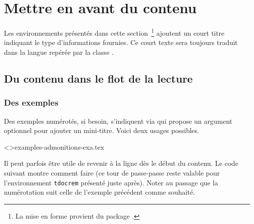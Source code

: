 
\section{Mettre en avant du contenu}

\begin{tdocnote}
    Les environnements présentés dans cette section\,%
    \footnote{
        La mise en forme provient du package .
    }
    ajoutent un court titre indiquant le type d'informations fournies.
    Ce court texte sera toujours traduit dans la langue repérée par la classe \thisproj.
\end{tdocnote}



\subsection{Du contenu dans le flot de la lecture}




\subsubsection{Des exemples}

Des exemples numérotés, si besoin, s'indiquent via  qui propose un argument optionnel pour ajouter un mini-titre.
Voici deux usages possibles.

\tdoclatexinput<>{examples-admonitions-exa.tex}


\begin{tdoctip}
    Il peut parfois être utile de revenir à la ligne dès le début du contenu. Le code suivant montre comment faire (ce tour de passe-passe reste valable pour l'environnement \verb#tdocrem# présenté juste après). Noter au passage que la numérotation suit celle de l'exemple précédent comme souhaité.
\end{tdoctip}

